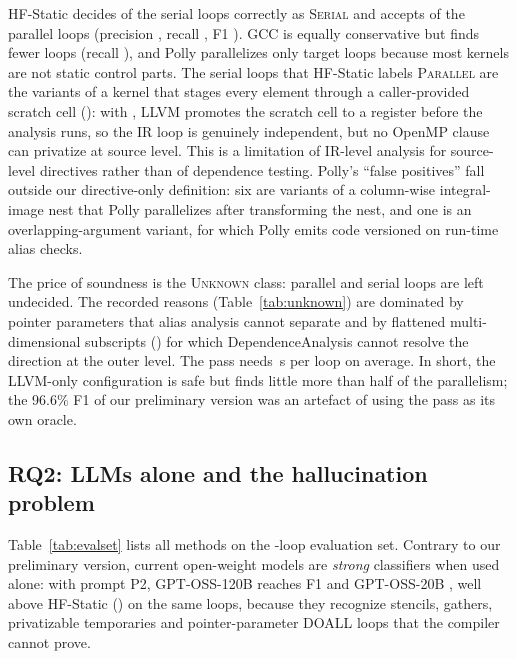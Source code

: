 HF-Static decides \nStaticSertoSer{} of the \nBenchSer{} serial loops correctly as \textsc{Serial} and accepts \fsStaticTP{} of the \nBenchPar{} parallel loops (precision \fsStaticPrec{}, recall \fsStaticRec{}, F1 \fsStaticFone{}). GCC is equally conservative but finds fewer loops (recall \fsGccRec{}), and Polly parallelizes only \fsPollyTP{} target loops because most kernels are not static control parts. The \nStaticFalsePar{} serial loops that HF-Static labels \textsc{Parallel} are the  variants of a kernel that stages every element through a caller-provided scratch cell (): with , LLVM promotes the scratch cell to a register before the analysis runs, so the IR loop is genuinely independent, but no OpenMP clause can privatize  at source level. This is a limitation of IR-level analysis for source-level directives rather than of dependence testing. Polly's \fsPollyFP{} ``false positives'' fall outside our directive-only definition: six are variants of a column-wise integral-image nest that Polly parallelizes after transforming the nest, and one is an overlapping-argument variant, for which Polly emits code versioned on run-time alias checks.

The price of soundness is the \textsc{Unknown} class: \nStaticPartoUnk{} parallel and \nStaticSertoUnk{} serial loops are left undecided. The recorded reasons (Table~\ref{tab:unknown}) are dominated by pointer parameters that alias analysis cannot separate and by flattened multi-dimensional subscripts () for which DependenceAnalysis cannot resolve the direction at the outer level. The pass needs \staticUsPerLoop{}\,\textmu s per loop on average. In short, the LLVM-only configuration is safe but finds little more than half of the parallelism; the 96.6\% F1 of our preliminary version was an artefact of using the pass as its own oracle.

\begin{table}[htbp]
\caption{Reasons recorded by HF-Static for \textsc{Unknown} target loops of HF-LoopBench (a loop can have several).}
\label{tab:unknown}
\centering\small

\end{table}

\subsection{RQ2: LLMs alone and the hallucination problem}
\label{sec:rq-ai}
Table~\ref{tab:evalset} lists all methods on the \nEvalLoops{}-loop evaluation set. Contrary to our preliminary version, current open-weight models are \emph{strong} classifiers when used alone: with prompt P2, GPT-OSS-120B reaches F1 \evAIOneTwentyFone{} and GPT-OSS-20B \evAITwentyFone{}, well above HF-Static (\evStaticFone{}) on the same loops, because they recognize stencils, gathers, privatizable temporaries and pointer-parameter DOALL loops that the compiler cannot prove.

